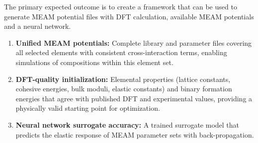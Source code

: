 \documentclass{phys400proposal}
\begin{document}
\expectedresults
The primary expected outcome is to create a framework that can be used to generate MEAM potential files with DFT calculation, available MEAM potentials and a neural network.

\begin{enumerate}
	\item \textbf{Unified MEAM potentials:} Complete library and parameter files covering all selected elements with consistent cross-interaction terms, enabling simulations of compositions within this element set.

	\item \textbf{DFT-quality initialization:} Elemental properties (lattice constants, cohesive energies, bulk moduli, elastic constants) and binary formation energies that agree with published DFT and experimental values, providing a physically valid starting point for optimization.

	\item \textbf{Neural network surrogate accuracy:} A trained surrogate model that predicts the elastic response of MEAM parameter sets with back-propagation.
\end{enumerate}

\begin{semestergantt}
\end{semestergantt}

\end{document}
